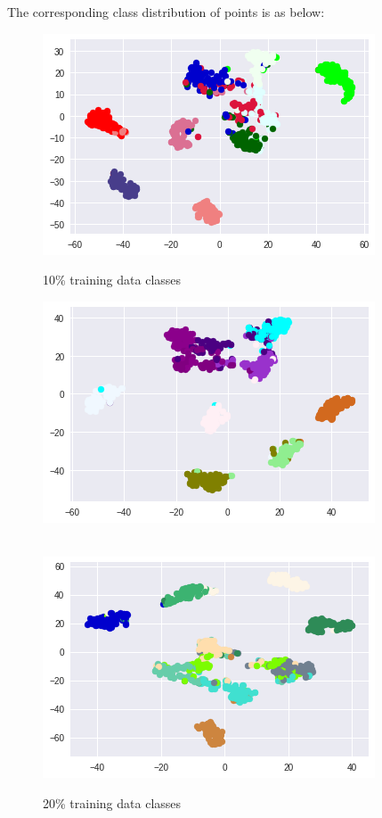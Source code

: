 \documentclass{article}
\begin{document}
The corresponding class distribution of points is as below:
\begin{figure}[!htb]
	\includegraphics[width=\linewidth]{../output_plots/FMNIST/clustering/class-distribution-10.png}
	\caption{10\% training data classes}\label{fig:part_1_task_5_class_10}
	\endminipage\hfill
	\includegraphics[width=\linewidth]{../output_plots/FMNIST/clustering/class-distribution-20.png}
	\caption{20\% training data classes}\label{fig:part_1_task_5_class_20}
	\endminipage\\
	\includegraphics[width=\linewidth]{../output_plots/FMNIST/clustering/class-distribution-30.png}

\end{figure}
\end{document}
